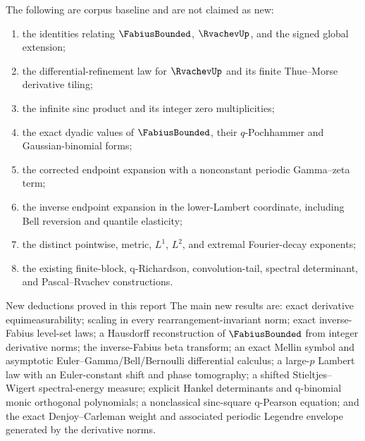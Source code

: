 \documentclass[11pt,oneside]{article}
\theoremstyle{definition}
\theoremstyle{remark}
\begin{document}
The following are corpus baseline and are not claimed as new:
\begin{enumerate}[label=(\roman*)]
\item the identities relating $\FabiusBounded$, $\RvachevUp$, and the signed global extension;
\item the differential-refinement law for $\RvachevUp$ and its finite Thue--Morse derivative tiling;
\item the infinite sinc product and its integer zero multiplicities;
\item the exact dyadic values of $\FabiusBounded$, their $q$-Pochhammer and
      Gaussian-binomial forms;
\item the corrected endpoint expansion with a nonconstant periodic Gamma--zeta term;
\item the inverse endpoint expansion in the lower-Lambert coordinate, including Bell
      reversion and quantile elasticity;
\item the distinct pointwise, metric, $L^1$, $L^2$, and extremal Fourier-decay exponents;
\item the existing finite-block, q-Richardson, convolution-tail, spectral determinant,
      and Pascal--Rvachev constructions.
\end{enumerate}

\begin{resultbox}{New deductions proved in this report}
The main new results are: exact derivative equimeasurability; scaling in every
rearrangement-invariant norm; exact inverse-Fabius level-set laws; a Hausdorff reconstruction
of $\FabiusBounded$ from integer derivative norms; the inverse-Fabius beta
transform; an exact Mellin
symbol and asymptotic Euler--Gamma/Bell/Bernoulli differential calculus; a large-$p$
Lambert law with an Euler-constant shift and phase tomography; a shifted
Stieltjes--Wigert spectral-energy measure; explicit Hankel determinants and q-binomial monic
orthogonal polynomials; a nonclassical sinc-square q-Pearson equation; and the exact
Denjoy--Carleman weight and associated periodic Legendre envelope generated by the derivative
norms.
\end{resultbox}
\end{document}
